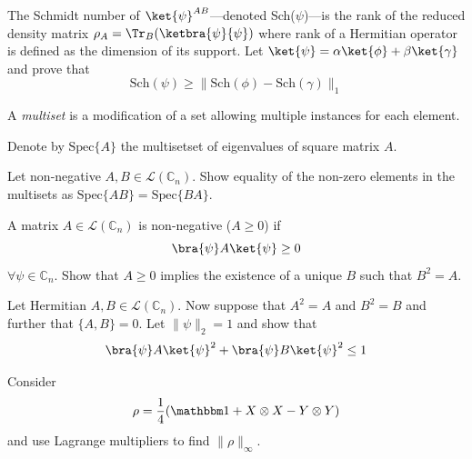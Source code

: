 \begin{myexercise}
The Schmidt number of $\ket{\psi}^{AB}$---denoted Sch($\psi$)---is the rank of the reduced density matrix $\rho_A = \Tr_B(\ketbra{\psi}{\psi})$ where rank of a Hermitian operator is defined as the dimension of its support. 
Let $\ket{\psi} = \alpha \ket{\phi} + \beta \ket{\gamma}$ and prove that 
\begin{equation}
\text{Sch}(\psi)\geq \|\text{Sch}(\phi) - \text{Sch}(\gamma)\|_1
\end{equation} 
\end{myexercise}

\begin{definition}
A {\it multiset} is a modification of a set allowing multiple instances for each element.
\end{definition}

\begin{definition}
 Denote by $\text{Spec}\{A\}$ the multisetset of eigenvalues of square matrix $A$. 
\end{definition}

\begin{myexercise}\label{prob:spec}
Let non-negative $A,B \in \mathcal{L}(\mathbb{C}_n)$.  Show equality of the non-zero elements in the multisets as $\text{Spec}\{AB\}=\text{Spec}\{BA\}$. 
\end{myexercise}

\begin{myexercise}
A matrix $A\in \mathcal{L}(\mathbb{C}_n)$ is non-negative ($A\geq 0$) if
\begin{equation}
    \bra{\psi}A\ket{\psi}\geq 0
\end{equation}
$\forall \psi \in \mathbb{C}_n$. Show that $A\geq 0$ implies the existence of a unique $B$ such that $B^2=A$.
\end{myexercise}

\begin{myexercise}
Let Hermitian $A,B \in \mathcal{L}(\mathbb{C}_n)$. Now suppose that $A^2 = A$ and $B^2=B$ and further that $\{A, B\}=0$.  Let $\|\psi\|_2=1$ and show that 
\begin{equation}
    \bra{\psi}A\ket{\psi}^2 + \bra{\psi}B\ket{\psi}^2\leq 1
\end{equation}
\end{myexercise}

\begin{myexercise}
Consider 
\begin{equation}
\rho = \frac{1}{4}(\I + X\otimes X -Y\otimes Y)
\end{equation} 
and use Lagrange multipliers to find $\|\rho \|_\infty$. 
\end{myexercise}


